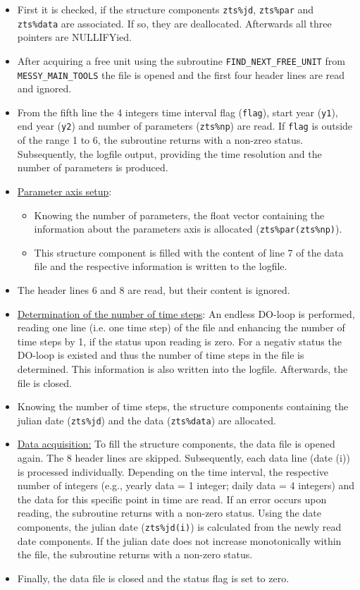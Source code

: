 \documentclass[11pt,twoside]{report}
\begin{document}
\begin{itemize}
\item First it is checked, if the structure
components \verb|zts%jd|, \verb|zts%par| 
and \verb|zts%data| are associated. If so, they are deallocated. Afterwards
all three pointers are NULLIFYied.
\item After acquiring a free unit using the
subroutine \verb|FIND_NEXT_FREE_UNIT|   
from \verb|MESSY_MAIN_TOOLS| the file is opened and the first four
header lines are read and ignored. 
\item From the fifth line the 4 integers 
time interval flag (\verb|flag|), start year (\verb|y1|), end year (\verb|y2|)
and number of parameters (\verb|zts%np|) are read.
If \verb|flag| is outside of the range  1 to 6,
 the subroutine returns with a non-zreo status.
Subsequently, the logfile output, providing the time resolution and
the number of parameters is produced.

\item \underline{Parameter axis setup}:
\begin{itemize}
\item Knowing the number of parameters, the float vector containing
the information about the parameters axis is allocated
(\verb|zts%par(zts%np)|). 
\item This structure component is filled with the content of line 7 of the data
file and the respective information is written to the logfile.
\end{itemize}
\item The header lines 6 and 8 are read, but their content is ignored.

\item \underline{Determination of the number of time steps}: An
endless DO-loop is performed, reading one line (i.e. one time step) 
of the file and enhancing the number of time steps by 1, if the status upon
reading is zero. For a negativ status the DO-loop is existed and thus the 
number of time steps in the file is determined. This information is also
written into the logfile. Afterwards, the file is closed.
\item Knowing the number of time steps, the structure components
containing the julian date  
(\verb|zts%jd|) and the data (\verb|zts%data|) are allocated.

\item \underline{Data acquisition:} To fill the structure components,
 the data file is opened again. The 8 header lines are skipped.
Subsequently, each data line (date (i)) is processed individually.
Depending on the time interval, the 
respective number of integers (e.g., yearly data = 1 integer; daily data = 4
integers) and the data for this specific point in time are read.
If an error occurs upon reading, the subroutine returns with a
non-zero status.
Using the date components, the julian date (\verb|zts%jd(i)|) is calculated 
from the newly read date components. If the julian date does not increase
monotonically within the file, the subroutine returns with a non-zero
status.

\item  Finally, the data file is closed and the status flag is set to zero.
\end{itemize}
\end{document}
